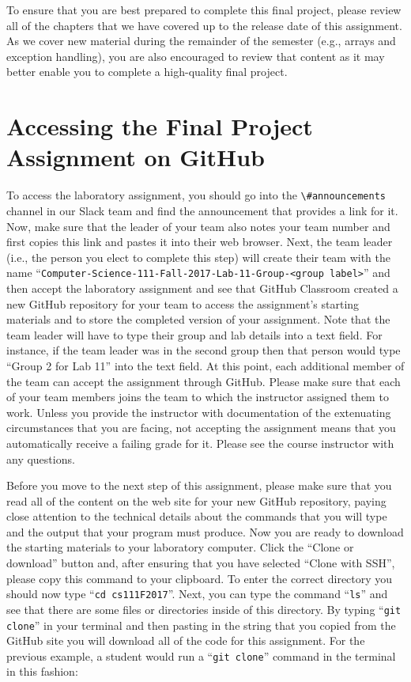 \documentclass[11pt]{article}
\newcommand{\command}[1]{``\lstinline{#1}''}
\newcommand{\channel}[1]{\lstinline{#1}}
\begin{document}
To ensure that you are best prepared to complete this final project, please review all of the chapters that we have
covered up to the release date of this assignment. As we cover new material during the remainder of the semester (e.g.,
arrays and exception handling), you are also encouraged to review that content as it may better enable you to complete a
high-quality final project.

\section*{Accessing the Final Project Assignment on GitHub}

To access the laboratory assignment, you should go into the \channel{\#announcements} channel in our Slack team and find
the announcement that provides a link for it. Now, make sure that the leader of your team also notes your team number
and first copies this link and pastes it into their web browser. Next, the team leader (i.e., the person you elect to
complete this step) will create their team with the name \command{Computer-Science-111-Fall-2017-Lab-11-Group-<group
label>} and then accept the laboratory assignment and see that GitHub Classroom created a new GitHub repository for your
team to access the assignment's starting materials and to store the completed version of your assignment. Note that the
team leader will have to type their group and lab details into a text field. For instance, if the team leader was in the
second group then that person would type ``Group 2 for Lab 11'' into the text field. At this point, each additional
member of the team can accept the assignment through GitHub. Please make sure that each of your team members joins the
team to which the instructor assigned them to work. Unless you provide the instructor with documentation of the
extenuating circumstances that you are facing, not accepting the assignment means that you automatically receive a
failing grade for it. Please see the course instructor with any questions.

Before you move to the next step of this assignment, please make sure that you read all of the content on the web site
for your new GitHub repository, paying close attention to the technical details about the commands that you will type
and the output that your program must produce. Now you are ready to download the starting materials to your laboratory
computer. Click the ``Clone or download'' button and, after ensuring that you have selected ``Clone with SSH'', please
copy this command to your clipboard. To enter the correct directory you should now type \command{cd cs111F2017}. Next,
you can type the command \command{ls} and see that there are some files or directories inside of this directory. By
typing \command{git clone} in your terminal and then pasting in the string that you copied from the GitHub site you will
download all of the code for this assignment. For the previous example, a student would run a \command{git clone}
command in the terminal in this fashion:
\end{document}
